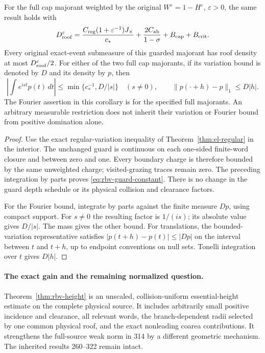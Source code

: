 \begin{corollary}
\label{cor:rbv-guard}
For the full cap majorant weighted by the original
$W^\varepsilon=1-H^\varepsilon$, $\varepsilon>0$, the same result
holds with
\begin{equation}\label{eq:rbv-guard-constant}
 D_{\rm roof}^\varepsilon
  =\frac{C_{\rm reg}(1+\varepsilon^{-1})J_\times}{c_*}
    +\frac{2C_{\rm ab}}{1-\sigma}+B_{\rm cap}+B_{\rm crit}.
\end{equation}
Every original exact-event submeasure of this guarded majorant has
roof density at most $D_{\rm roof}^\varepsilon/2$.
For either of the two full cap majorants, if its variation bound
is denoted by $D$ and its density by $p$, then
\begin{equation}\label{eq:rbv-fourier}
 \left|\int e^{ist}p(t)\,dt\right|
            \le\min\{c_*^{-1},D/|s|\}\quad(s\ne0),\qquad
 \|p(\cdot+h)-p\|_1\le D|h|.
\end{equation}
The Fourier assertion in this corollary is for the specified full
majorants.  An arbitrary measurable restriction does not inherit
their variation or Fourier bound from positive domination alone.
\end{corollary}
\begin{proof}
Use the exact regular-variation inequality of
Theorem~\ref{thm:el-regular} in the interior.  The unchanged guard
is continuous on each one-sided finite-word closure and between
zero and one.  Every boundary charge is therefore bounded by the
same unweighted charge; visited-grazing traces remain zero.
The preceding integration by parts proves
\eqref{eq:rbv-guard-constant}.  There is no change in the guard
depth schedule or its physical collision and clearance factors.

For the Fourier bound, integrate by parts against the finite measure
$Dp$, using compact support.  For $s\ne0$ the resulting factor is
$1/(is)$; its absolute value gives $D/|s|$.  The mass gives the
other bound.  For translations, the bounded-variation representative
satisfies $|p(t+h)-p(t)|\le |Dp|$ on the interval between $t$ and
$t+h$, up to endpoint conventions on null sets.  Tonelli integration
over $t$ gives $D|h|$.
\end{proof}

\paragraph{The exact gain and the remaining normalized question.}
Theorem~\ref{thm:rbv-height} is an unscaled, collision-uniform
essential-height estimate on the complete physical source.  It
includes arbitrarily small positive incidence and clearance,
all relevant words, the branch-dependent radii selected by one
common physical roof, and the exact nonleading coarea contributions.
It strengthens the full-source weak norm in 314 by a different
geometric mechanism.  The inherited results 260--322 remain intact.

